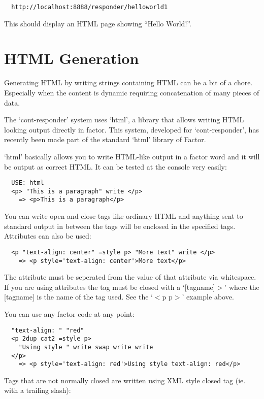 \begin{verbatim}
  http://localhost:8888/responder/helloworld1
\end{verbatim}

This should display an HTML page showing ``Hello World!''.

\section{HTML Generation}

Generating HTML by writing strings containing HTML can be a bit of a
chore. Especially when the content is dynamic requiring concatenation
of many pieces of data. 

The `cont-responder' system uses `html', a library that allows writing
HTML looking output directly in factor. This system, developed for
`cont-responder', has recently been made part of the standard `html'
library of Factor.

`html' basically allows you to write HTML-like output in a factor word
and it will be output as correct HTML. It can be tested at the console
very easily:

\begin{verbatim}
  USE: html
  <p> "This is a paragraph" write </p>
    => <p>This is a paragraph</p>
\end{verbatim}

You can write open and close tags like ordinary HTML and anything sent
to standard output in between the tags will be enclosed in the
specified tags. Attributes can also be used:

\begin{verbatim}
  <p "text-align: center" =style p> "More text" write </p>
    => <p style='text-align: center'>More text</p>
\end{verbatim}

The attribute must be seperated from the value of that attribute via
whitespace. If you are using attributes the tag must be closed with a
`[tagname]$>$' where the [tagname] is the name of the tag used. See the
`$<$p p$>$' example above.

You can use any factor code at any point:
 
\begin{verbatim}
  "text-align: " "red" 
  <p 2dup cat2 =style p> 
    "Using style " write swap write write
  </p>
    => <p style='text-align: red'>Using style text-align: red</p>
\end{verbatim}

Tags that are not normally closed are written using XML style closed
tag (ie. with a trailing slash):

